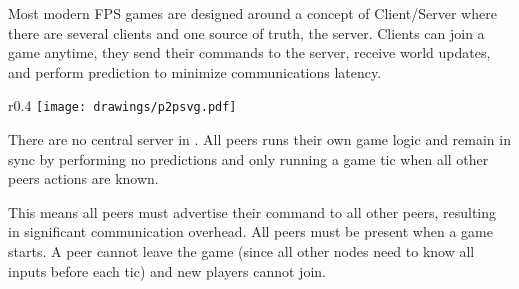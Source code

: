 Most modern FPS games are designed around a concept of Client/Server where there are several clients and one source of truth, the server. Clients can join a game anytime, they send their commands to the server, receive world updates, and perform prediction to minimize communications latency.\\
\par
\begin{wrapfigure}[12]{r}{0.4\textwidth}
\centering
\texttt{[image: drawings/p2psvg.pdf]}
\end{wrapfigure}
There are no central server in \doom. All peers runs their own game logic and remain in sync by performing no predictions and only running a game tic when all other peers actions are known.\\
\par
 This means all peers must advertise their command to all other peers, resulting in significant communication overhead. 
All peers must be present when a game starts. A peer cannot leave the game (since all other nodes need to know all inputs before each tic) and new players cannot join.
\pagebreak





